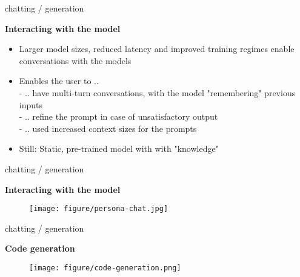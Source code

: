 
\begin{vbframe}{chatting / generation}

\vfill
	
\textbf{Interacting with the model}

\begin{itemize}
	\item Larger model sizes, reduced latency and improved training regimes enable conversations with the models
	\item Enables the user to .. \\
	- .. have multi-turn conversations, with the model "remembering" previous inputs\\
	- .. refine the prompt in case of unsatisfactory output\\
	- .. used increased context sizes for the prompts
	\item Still: Static, pre-trained model with with "knowledge" 
\end{itemize}

\vfill

\end{vbframe}


\begin{vbframe}{chatting / generation}

\vfill
	
\textbf{Interacting with the model}

\begin{figure}
	\centering
		\texttt{[image: figure/persona-chat.jpg]}\\ 
\end{figure}

\vfill

\end{vbframe}


\begin{vbframe}{chatting / generation}

\vfill
	
\textbf{Code generation}

\begin{figure}
	\centering
		\texttt{[image: figure/code-generation.png]}\\ 
\end{figure}

\vfill

\end{vbframe}

